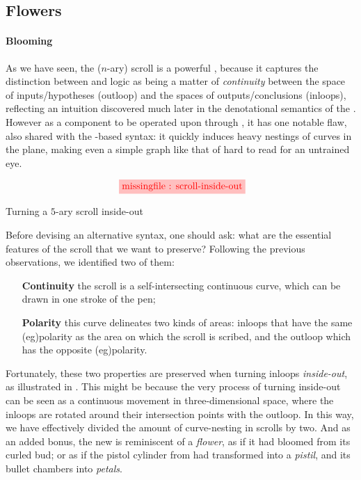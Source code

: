 \begin{scope}
\section{Flowers}

\paragraph{Blooming}

As we have seen, the ($n$-ary) scroll is a powerful , because it captures
the distinction between  and  logic as being a matter of
\emph{continuity} between the space of inputs/hypotheses (outloop) and the
spaces of outputs/conclusions (inloops), reflecting an intuition discovered much
later in the denotational semantics of the . However as a
 component to be operated upon through , it has
one notable flaw, also shared with the  -based syntax: it quickly
induces heavy nestings of curves in the plane, making even a simple graph like
that of  hard to read for an untrained eye.

\begin{marginfigure}
  $$
  \tikzfig{1}{0.4}{scroll-inside-out}
  $$
  \caption{Turning a $5$-ary scroll inside-out}
\end{marginfigure}

Before devising an alternative syntax, one should ask: what are the essential
features of the scroll that we want to preserve? Following the previous
observations, we identified two of them:
\begin{itemize}
  \item[\textbf{Continuity}] the scroll is a self-intersecting continuous curve,
  which can be drawn in one stroke of the pen;
  \item[\textbf{Polarity}] this curve delineates two kinds of areas: inloops that have
  the same \kl(eg){polarity} as the area on which the scroll is scribed, and the outloop
  which has the opposite \kl(eg){polarity}.
\end{itemize}

Fortunately, these two properties are preserved when turning inloops
\emph{inside-out}, as illustrated in . This might be
because the very process of turning inside-out can be seen as a continuous
movement in three-dimensional space, where the inloops are rotated around their
intersection points with the outloop. In this way, we have effectively divided
the amount of curve-nesting in scrolls by two. And as an added bonus, the new
 is reminiscent of a \emph{flower}, as if it had bloomed from its curled
bud; or as if the pistol cylinder from  had transformed into
a \emph{pistil}, and its bullet chambers into \emph{petals}.


\end{scope}
